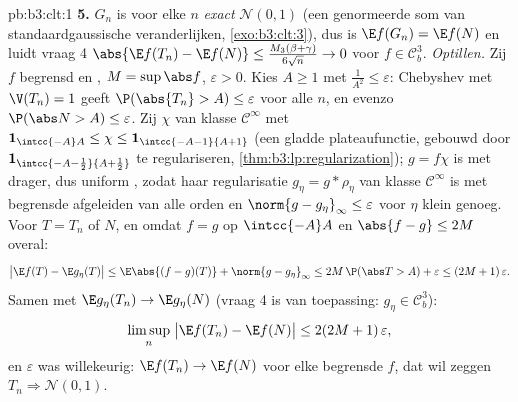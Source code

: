 \begin{solution}{pb:b3:clt:1}
\textbf{5.} $G_n$ is voor elke $n$ \emph{exact} $\mathcal
N(0,1)$ (een genormeerde som van 
standaardgaussische veranderlijken, \cref{exo:b3:clt:3}),
dus is $\E f(G_n) = \E f(N)$ en luidt vraag 4 $\abs{\E
f(T_n) - \E f(N)} \leq \frac{M_3(\beta+\gamma)}{6\sqrt n}
\to 0$ voor $f \in \mathcal C^3_b$. \emph{Optillen.} Zij
$f$ begrensd en , $M = \sup\abs f$, $\varepsilon >
0$. Kies $A \geq 1$ met $\frac1{A^2} \leq \varepsilon$:
Chebyshev met $\V(T_n) = 1$ geeft $\P(\abs{T_n} > A) \leq
\varepsilon$ voor alle $n$, en evenzo $\P(\abs N > A) \leq
\varepsilon$. Zij $\chi$ van klasse $\mathcal C^\infty$ met
$\mathbf 1_{\intcc{-A}A} \leq \chi \leq
\mathbf 1_{\intcc{-A-1}{A+1}}$ (een gladde plateaufunctie,
gebouwd door $\mathbf 1_{\intcc{-A-\frac12}{A+\frac12}}$ te
regulariseren, \cref{thm:b3:lp:regularization}); $g = f\chi$
is  met  drager, dus uniform , zodat
haar regularisatie $g_\eta = g * \rho_\eta$ van klasse
$\mathcal C^\infty$ is met begrensde afgeleiden van alle
orden en $\norm{g - g_\eta}_\infty \leq \varepsilon$ voor
$\eta$ klein genoeg. Voor $T = T_n$ of $N$, en omdat $f =
g$ op $\intcc{-A}A$ en $\abs{f - g} \leq 2M$ overal:
\[
\bigl|\E f(T) - \E g_\eta(T)\bigr| \leq
\E\abs{(f - g)(T)} + \norm{g - g_\eta}_\infty
\leq 2M\,\P(\abs T > A) + \varepsilon \leq
(2M + 1)\,\varepsilon .
\]
Samen met $\E g_\eta(T_n) \to \E g_\eta(N)$ (vraag 4 is van
toepassing: $g_\eta \in \mathcal C^3_b$):
\[
\limsup_n\;\bigl|\E f(T_n) - \E f(N)\bigr| \leq
2(2M + 1)\,\varepsilon ,
\]
en $\varepsilon$ was willekeurig: $\E f(T_n) \to \E f(N)$
voor elke begrensde  $f$, dat wil zeggen $T_n
\Rightarrow \mathcal N(0,1)$.


\end{solution}
